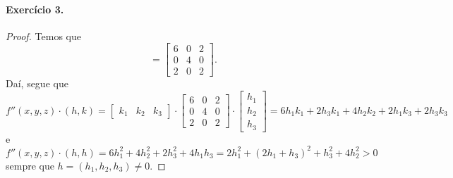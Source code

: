 \documentclass[12pt,a4paper]{article}
\begin{document}
\paragraph{Exercício 3.}
%
\begin{proof}
    Temos que
    \begin{equation*}
        [f''(x,y,z)] = 
        \begin{bmatrix}
            6 & 0 & 2 \\
            0 & 4 & 0 \\
            2 & 0 & 2
        \end{bmatrix}.
    \end{equation*}
    Daí, segue que
    \begin{equation*}
        f''(x,y,z)\cdot (h,k) = 
        \begin{bmatrix}
            k_1 & k_2 & k_3
        \end{bmatrix}\cdot
        \begin{bmatrix}
            6 & 0 & 2 \\
            0 & 4 & 0 \\
            2 & 0 & 2
        \end{bmatrix}\cdot
        \begin{bmatrix}
            h_1 \\
            h_2 \\
            h_3
        \end{bmatrix} =
        6h_1k_1 + 2h_3k_1 + 4h_2k_2 + 2h_1k_3 + 2h_3k_3 
    \end{equation*}
    e
    \begin{equation*}
        f''(x,y,z) \cdot (h,h) = 6h_1^2 + 4h_2^2 + 2h_3^2 + 4h_1h_3
                               = 2h_1^2 + (2h_1 + h_3)^2 + h_3^2 + 4h_2^2 > 0
    \end{equation*}
    sempre que $h = (h_1, h_2, h_3) \neq 0$.
\end{proof}
%
\end{document}

